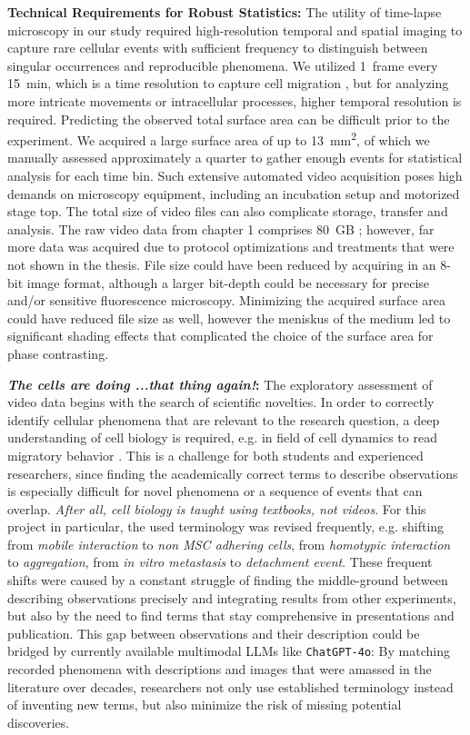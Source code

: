 \textbf{Technical Requirements for Robust Statistics:} The utility of time-lapse
microscopy in our study required high-resolution temporal and spatial imaging to
capture rare cellular events with sufficient frequency to distinguish between
singular occurrences and reproducible phenomena. We utilized \SI{1}{frame} every
\SI{15}{\minute}, which is a  time resolution to capture cell migration
\cite{huthSignificantlyImprovedPrecision2010}, but for analyzing more intricate
movements or intracellular processes, higher temporal resolution is required.
Predicting the observed total surface area can be difficult prior to the
experiment. We acquired a large surface area of up to
\SI{13}{\milli\meter\squared}, of which we manually assessed approximately a
quarter to gather enough events for statistical analysis for each time bin. Such
extensive automated video acquisition poses high demands on microscopy
equipment, including an incubation setup and motorized stage top. The total size
of video files can also complicate storage, transfer and analysis. The raw video
data from chapter 1 comprises \SI{80}{GB}
\cite{biostudiesBioStudiesEuropeanBioinformatics}; however, far more data was
acquired due to protocol optimizations and treatments that were not shown in the
thesis. File size could have been reduced by acquiring in an 8-bit image format,
although a larger bit-depth could be necessary for precise and/or sensitive
fluorescence microscopy. Minimizing the acquired surface area could have reduced
file size as well, however the meniskus of the medium led to significant shading
effects that complicated the choice of the surface area for phase contrasting.

\textbf{\textit{The cells are doing ...that thing again!}:} The exploratory
assessment of video data begins with the search of scientific novelties. In
order to correctly identify cellular phenomena that are relevant to the research
question, a deep understanding of cell biology is required, e.g. in field of
cell dynamics to read migratory behavior
\cite{nalbantExploratoryCellDynamics2018}. This is a challenge for both students
and experienced researchers, since finding the academically correct terms to
describe observations is especially difficult for novel phenomena or a sequence
of events that can overlap. \emph{After all, cell biology is taught using
    textbooks, not videos}. For this project in particular, the used terminology was
revised frequently, e.g. shifting from \emph{mobile interaction} to \emph{non
    MSC adhering cells}, from \emph{homotypic interaction} to \emph{aggregation},
from \emph{in vitro metastasis} to \emph{detachment event}. These frequent
shifts were caused by a constant struggle of finding the middle-ground between
describing observations precisely and integrating results from other
experiments, but also by the need to find terms that stay comprehensive in
presentations and publication. This gap between observations and their
description could be bridged by currently available multimodal \acp{LLM} like
\texttt{ChatGPT-4o}: By matching recorded phenomena with descriptions and images
that were amassed in the literature over decades, researchers not only use
established terminology instead of inventing new terms, but also minimize the
risk of missing potential discoveries.


